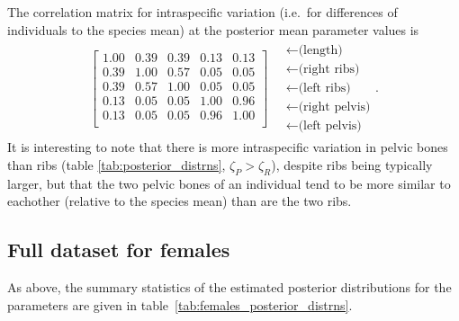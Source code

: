 \documentclass{article}
\begin{document}
The correlation matrix for intraspecific variation 
(i.e.\ for differences of individuals to the species mean)
at the posterior mean parameter values is
\begin{align}
\begin{bmatrix}
   1.00 & 0.39 & 0.39 & 0.13 & 0.13 \\ 
   0.39 & 1.00 & 0.57 & 0.05 & 0.05 \\ 
   0.39 & 0.57 & 1.00 & 0.05 & 0.05 \\ 
   0.13 & 0.05 & 0.05 & 1.00 & 0.96 \\ 
   0.13 & 0.05 & 0.05 & 0.96 & 1.00 \\ 
 \end{bmatrix}
\quad \begin{matrix}
  \leftarrow \text{(length)} \\
  \leftarrow \text{(right ribs)} \\
  \leftarrow \text{(left ribs)} \\
  \leftarrow \text{(right pelvis)} \\
  \leftarrow \text{(left pelvis)} 
\end{matrix}  .
\end{align}
It is interesting to note that there is more intraspecific variation in pelvic bones than ribs (table \ref{tab:posterior_distrns}, $\zeta_P > \zeta_R$),
despite ribs being typically larger,
but that the two pelvic bones of an individual tend to be more similar to eachother (relative to the species mean) than are the two ribs.

\subsection{Full dataset for females}

As above, the summary statistics of the estimated posterior distributions 
for the parameters
are given in table~\ref{tab:females_posterior_distrns}.
\end{document}
